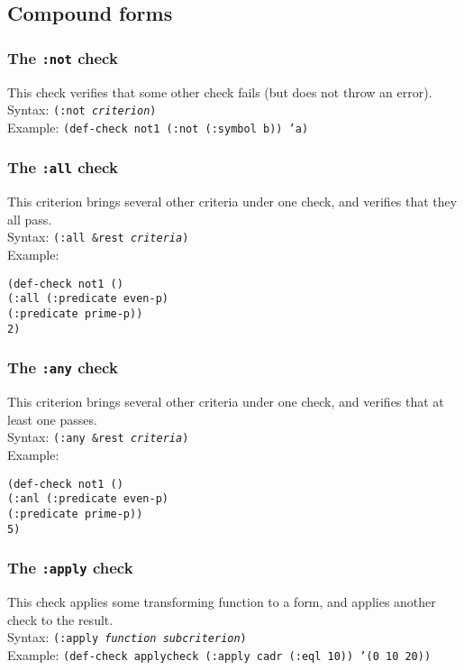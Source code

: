 \documentclass{article}
\begin{document}
\subsection{Compound forms}

\subsubsection{The \texttt{:not} check} 
This check verifies that some other check fails (but does not throw an
error).
\\ Syntax: \texttt{(:not \emph{criterion})}
\\ Example: \texttt{(def-check not1 (:not (:symbol b)) 'a)}

\subsubsection{The \texttt{:all} check} 
This criterion brings several other criteria under one check, and
verifies that they all pass.
\\ Syntax: \texttt{(:all \&rest \emph{criteria})}
\\ Example:
\begin{tabbing}
\texttt{(de}\=\texttt{f-}\=\texttt{check not1 ()}
\\ \>\>\texttt{(:all }\=\texttt{(:predicate even-p)}
\\ \>\>\>\texttt{(:predicate prime-p))}
\\ \>\texttt{2)}
\end{tabbing}

\subsubsection{The \texttt{:any} check} 
This criterion brings several other criteria under one check, and
verifies that at least one passes.
\\ Syntax: \texttt{(:any \&rest \emph{criteria})}
\\ Example:
\begin{tabbing}
\texttt{(de}\=\texttt{f-}\=\texttt{check not1 ()}
\\ \>\>\texttt{(:anl }\=\texttt{(:predicate even-p)}
\\ \>\>\>\texttt{(:predicate prime-p))}
\\ \>\texttt{5)}
\end{tabbing}

\subsubsection{The \texttt{:apply} check}
This check applies some transforming function to a form, and applies
another check to the result.
\\ Syntax: \texttt{(:apply \textit{function} \textit{subcriterion})}
\\ Example: \texttt{(def-check applycheck (:apply cadr (:eql 10)) '(0 10 20))}
\end{document}
